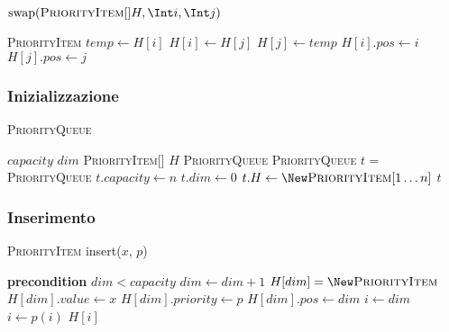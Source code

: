             \begin{algorithm}[H]
                \caption{$\operatorname{swap}(\textsc{PriorityItem}[] H, \Int i, \Int j)$}
                \begin{algorithmic}
                    \State \textsc{PriorityItem} $temp \gets H[i]$
                    \State $H[i] \gets H[j]$
                    \State $H[j] \gets temp$
                    \State $H[i].pos \gets i$
                    \State $H[j].pos \gets j$
                \end{algorithmic}
            \end{algorithm}
        
        \subsubsection{Inizializzazione}
            \begin{algorithm}[H]
                \caption{\textsc{PriorityQueue}}
                \begin{algorithmic}
                    \State \Int $capacity$ 
                    \State \Int $dim$ 
                    \State \textsc{PriorityItem}[] $H$ 
                    \State \textsc{PriorityQueue} 
                            \State \textsc{PriorityQueue} $t$ = \New \textsc{PriorityQueue}
                            \State $t.capacity \gets n$
                            \State $t.dim \gets 0$
                            \State $t.H \gets \New \textsc{PriorityItem}[1\dots n]$
                            \State \Return $t$
                        \EndFunction
                \end{algorithmic}
            \end{algorithm}
        \subsubsection{Inserimento}
            \begin{algorithm}[H]
                \caption{\textsc{PriorityItem} insert(\Item $x$, \Int $p$)}
                \begin{algorithmic}
                    \State \textbf{precondition} $dim < capacity$
                    \State $dim \gets dim+1$
                    \State $H[dim] = \New \textsc{PriorityItem}$
                    \State $H[dim].value \gets x$
                    \State $H[dim].priority \gets p$
                    \State $H[dim].pos \gets dim$
                    \State \Int $i \gets dim$
                        \State {}
                        \State $i \gets p(i)$
                    \EndWhile
                    \State \Return $H[i]$
                \end{algorithmic}
            \end{algorithm}
